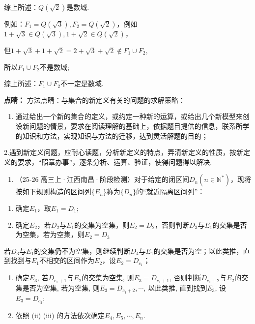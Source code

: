 \documentclass[11pt,a4paper]{ctexart}
\begin{document}
综上所述：\(Q(\sqrt{2})\)是数域.

例如：\(F_{1}=Q(\sqrt{3}),F_{2}=Q(\sqrt{2})\)，例如\(1+\sqrt{3}\in Q(\sqrt{3}),1+\sqrt{2}\in Q(\sqrt{2})\)，

但\(1 + \sqrt{3} + 1 + \sqrt{2} = 2 + \sqrt{3} + \sqrt{2} \notin F_1 \cup F_2\),

所以\(F_{1}\cup F_{2}\)不是数域;

综上所述：\(F_{1} \cup F_{2}\)不一定是数域.

\textbf{点睛：}
方法点睛：与集合的新定义有关的问题的求解策略：

\begin{enumerate}[label=\arabic*., leftmargin=*]
\item 通过给出一个新的集合的定义，或约定一种新的运算，或给出几个新模型来创设新问题的情景，要求在阅读理解的基础上，依据题目提供的信息，联系所学的知识和方法，实现知识与方法的迁移，达到灵活解题的目的；
\end{enumerate}

2.遇到新定义问题，应耐心读题，分析新定义的特点，弄清新定义的性质，按新定义的要求，``照章办事''，逐条分析、运算、验证，使得问题得以解决.

\begin{enumerate}[label=\arabic*., leftmargin=*, start=7]
\item （25-26
  高三上·江西南昌·阶段检测）对于给定的闭区间\(D_{n}(n \in \mathbb{N}^{*})\)，现将按如下规则构造的区间列\(\{E_{n}\}\)称为\(\{D_{n}\}\)的``就近隔离区间列''：
\end{enumerate}

\begin{enumerate}[label=(\roman*), leftmargin=*]
\item 确定\(E_{1}\)，取\(E_{1}=D_{1}\);
\item
  确定\(E_{2}\)，若\(D_{2}\)与\(E_{1}\)的交集为空集，则\(E_{2}=D_{2}\)，否则判断\(D_{3}\)与\(E_{1}\)的交集是否为空集，若为空集，则\(E_{2}=D_{3}\)
\end{enumerate}

若\(D_{3}\)与\(E_{1}\)的交集仍不为空集，则继续判断\(D_{4}\)与\(E_{1}\)的交集是否为空；以此类推，直到找到与\(E_{1}\)不相交的区间作为\(E_{2}\)，设\(E_{2}=D_{c_{1}}\)；

\begin{enumerate}[label=(\roman*), leftmargin=*, start=3]
\item 确定\(E_{3}\), 若\(D_{c_{1}+1}\)与\(E_{2}\)的交集为空集,
  则\(E_{3} = D_{c_{1}+1}\),
  否则判断\(D_{c_{1}+2}\)与\(E_{2}\)的交集是否为空集, 若为空集,
  则\(E_{3} = D_{c_{1}+2}, \cdots\), 以此类推, 直到找到\(E_{3}\),
  设\(E_{3} = D_{c_{2}}\);
\item
  依照 (ii) (iii) 的方法依次确定\(E_{4}, E_{5}, \cdots, E_{n}\).
\end{enumerate}
\end{document}
